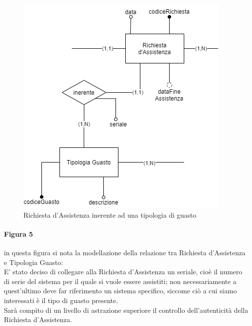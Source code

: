 \documentclass[legalpaper]{article}
\begin{document}
\begin{figure}[!ht]
	\centering
	\begin{minipage}[b]{0.4\textwidth}
		\includegraphics[width=\linewidth]{image/assistGuasto.png}
		\caption{Richiesta d'Assistenza inerente ad una tipologia di guasto}
		\label{fig:RichiestaInerenteGuasto}
	\end{minipage}
	\hfill
	
\end{figure}
\paragraph{Figura 5}
in questa figura si nota la modellazione della relazione tra Richiesta d'Assistenza e Tipologia Guasto:\\
E' stato deciso di collegare alla Richiesta d'Assistenza un seriale, cioè il numero di serie del sistema per il quale si vuole essere assistiti; non necessariamente a quest'ultimo deve far riferimento un sistema specifico, siccome ciò a cui siamo interessati è il tipo di guasto presente.\\
Sarà compito di un livello di astrazione superiore il controllo dell'autenticità della Richiesta d'Assistenza.\\ 
\end{document}
